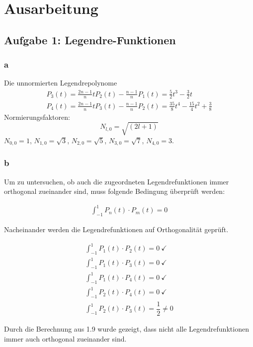 \chapter{Ausarbeitung}
\section{Aufgabe 1: Legendre-Funktionen}
\subsection{a}
Die unnormierten Legendrepolynome
\begin{gather}
	P_3(t) = \frac{2n-1}{n} t P_2(t) - \frac{n-1}{n}P_1(t) = \frac{5}{2}t^3-\frac{3}{2}t \\
	P_4(t) = \frac{2n-1}{n} t P_3(t) - \frac{n-1}{n}P_2(t) = \frac{35}{8}t^4 - \frac{15}{4}t^2 + \frac{3}{8}
\end{gather}
Normierungsfaktoren:
\begin{equation}
	N_{l,0} = \sqrt{(2l+1)}	
\end{equation}
$N_{0,0} = 1$, $N_{1,0} = \sqrt{3}$, $N_{2,0} = \sqrt{5}$, $N_{3,0} = \sqrt{7}$, $N_{4,0} = 3$.
\subsection{b}
Um zu untersuchen, ob auch die zugeordneten Legendrefunktionen immer orthogonal zueinander sind, muss folgende Bedingung überprüft werden: 

\begin{gather}
\int_{-1}^{1} P_n(t) \cdot P_m(t) = 0   
\end{gather}

Nacheinander werden die Legendrefunktionen auf Orthogonalität geprüft. 

\begin{gather}
\int_{-1}^{1} P_1(t) \cdot P_2(t) = 0 ~\checkmark \\
\int_{-1}^{1} P_1(t) \cdot P_3(t) = 0 ~\checkmark \\
\int_{-1}^{1} P_1(t) \cdot P_4(t) = 0 ~\checkmark \\
\int_{-1}^{1} P_2(t) \cdot P_4(t) = 0 ~\checkmark \\
\int_{-1}^{1} P_2(t) \cdot P_3(t) = \dfrac{1}{2} \neq 0 
\end{gather}

Durch die Berechnung aus 1.9 wurde gezeigt, dass nicht alle Legendrefunktionen immer auch orthogonal zueinander sind. 


\clearpage
